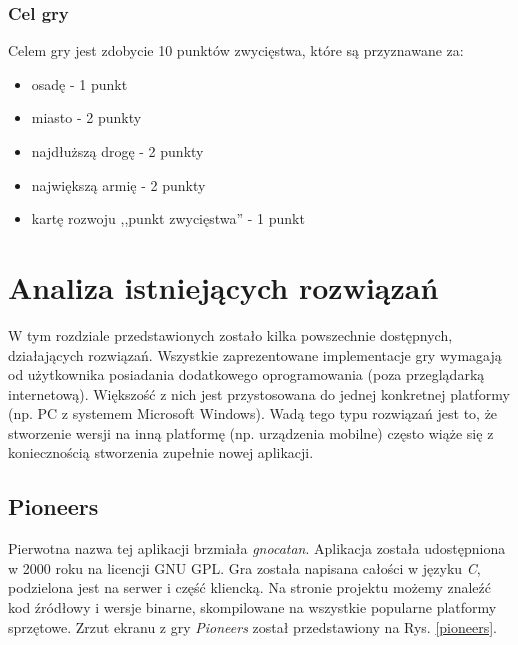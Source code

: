 \documentclass[a4paper,12pt]{article}
\providecommand{\imref}[1]{Rys. \ref{#1}} %
\begin{document}
\subsubsection{Cel gry}
Celem gry jest zdobycie 10 punktów zwycięstwa, które są przyznawane
za:

\begin{itemize}
\item osadę - 1 punkt
\item miasto - 2 punkty
\item najdłuższą drogę - 2 punkty
\item największą armię - 2 punkty
\item kartę rozwoju ,,punkt zwycięstwa'' - 1 punkt
\end{itemize}

\clearpage

\section{Analiza istniejących rozwiązań}
W tym rozdziale przedstawionych zostało kilka powszechnie dostępnych,
działających rozwiązań. Wszystkie zaprezentowane implementacje gry
wymagają od użytkownika posiadania dodatkowego oprogramowania (poza
przeglądarką internetową). Większość z nich jest przystosowana do
jednej konkretnej platformy (np. PC z systemem Microsoft
Windows). Wadą tego typu rozwiązań jest to, że stworzenie wersji na
inną platformę (np. urządzenia mobilne) często wiąże się z
koniecznością stworzenia zupełnie nowej aplikacji.

\subsection{Pioneers}
Pierwotna nazwa tej aplikacji brzmiała \emph{gnocatan}. Aplikacja
została udostępniona w 2000 roku na licencji GNU GPL. Gra została
napisana całości w języku \emph{C}, podzielona jest na serwer i część
kliencką. Na stronie projektu \cite{pioneers} możemy znaleźć kod
źródłowy i wersje binarne, skompilowane na wszystkie popularne
platformy sprzętowe. Zrzut ekranu z gry \emph{Pioneers} został
przedstawiony na \imref{pioneers}.
\end{document}

